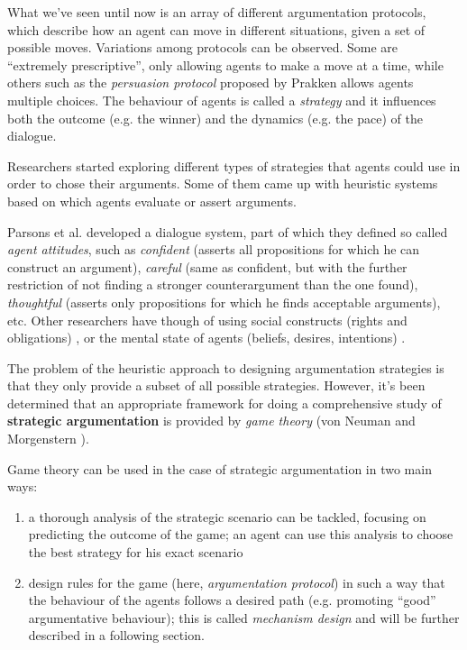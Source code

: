 \documentclass[12pt, a4paper]{article}
\begin{document}
What we've seen until now is an array of different argumentation protocols,
which describe how an agent can move in different situations, given a set
of possible moves. Variations among protocols can be observed. Some are
``extremely prescriptive'', only allowing agents to make a move at a time,
while others such as the \emph{persuasion protocol} proposed by Prakken allows
agents multiple choices. The behaviour of agents is called a \emph{strategy}
and it influences both the outcome (e.g. the winner) and the dynamics (e.g. the
pace) of the dialogue.

Researchers started exploring different types of strategies that agents could
use in order to chose their arguments. Some of them came up with heuristic
systems based on which agents evaluate or assert arguments.

Parsons et al. \cite{parsons2003properties} developed a dialogue system, part
of which they defined so called \emph{agent attitudes}, such as
\emph{confident} (asserts all propositions for which he can construct an
argument), \emph{careful} (same as confident, but with the further restriction
of not finding a stronger counterargument than the one found),
\emph{thoughtful} (asserts only propositions for which he finds acceptable
arguments), etc. Other researchers have though of using social constructs
(rights and obligations) \cite{karunatillake2009dialogue}, or the mental state
of agents (beliefs, desires, intentions) \cite{kraus1998reaching}.

The problem of the heuristic approach to designing argumentation strategies is
that they only provide a subset of all possible strategies. However, it's been
determined that an appropriate framework for doing a comprehensive study of
\textbf{strategic argumentation} is provided by \emph{game theory} (von Neuman
and Morgenstern \cite{von2007theory}). 


Game theory can be used in the case of strategic argumentation in two main ways:
\begin{enumerate}
    \item a thorough analysis of the strategic scenario can be tackled,
        focusing on predicting the outcome of the game; an agent can use this
        analysis to choose the best strategy for his exact scenario
    \item design rules for the game (here, \emph{argumentation protocol}) in
        such a way that the behaviour of the agents follows a desired path
        (e.g. promoting ``good'' argumentative behaviour); this is called
        \emph{mechanism design} and will be further described in a following
        section.
\end{enumerate}
\end{document}
